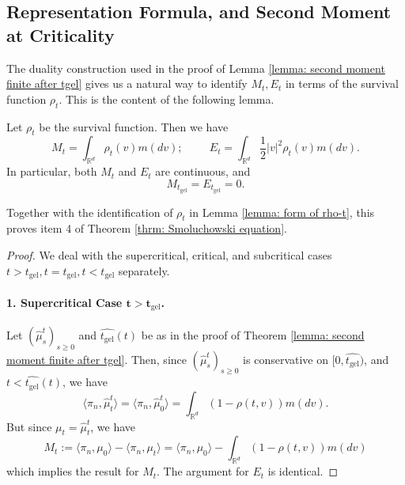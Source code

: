 \subsection{Representation Formula, and Second Moment at Criticality} 

The duality construction used in the proof of Lemma \ref{lemma: second moment finite after tgel} gives us a natural way to identify $M_t, E_t$ in terms of the survival function $\rho_t$. This is the content of the following lemma. \begin{lemma}\label{lemma: representation of M, E} Let $\rho_t$ be the survival function. Then we have \begin{equation}\label{eq: formula for M, E}
    M_t = \int_{\mathbb{R}^d} \rho_t(v)m(dv); \hspace{1cm} E_t=\int_{\mathbb{R}^d} \frac{1}{2}|v|^2\rho_t(v)m(dv).
\end{equation} In particular, both $M_t$ and $E_t$ are continuous, and \begin{equation}
    M_{t_\mathrm{gel}}=E_{t_\mathrm{gel}}=0.
\end{equation} \end{lemma} Together with the identification of $\rho_t$ in Lemma \ref{lemma: form of rho-t}, this proves item 4 of Theorem \ref{thrm: Smoluchowski equation}. \begin{proof} We deal with the supercritical, critical, and subcritical cases $t>t_\mathrm{gel}, t=t_\mathrm{gel}, t<t_\mathrm{gel}$ separately. 
\paragraph{1. Supercritical Case $\mathbf{t>t_\mathrm{gel}}$.}  Let $(\widehat{\mu}^t_s)_{s\geq 0}$ and $\widehat{t_\mathrm{gel}}(t)$ be as in the proof of Theorem \ref{lemma: second moment finite after tgel}. Then, since $(\widehat{\mu}^t_s)_{s\geq 0}$ is conservative on $[0, \widehat{t_\mathrm{gel}})$, and $t<\widehat{t_\mathrm{gel}}(t)$, we have \begin{equation}
    \langle \pi_n, \widehat{\mu}^t_t\rangle =\langle \pi_n, \widehat{\mu}^t_0\rangle = \int_{\mathbb{R}^d} (1-\rho(t,v))m(dv).
\end{equation} But since $\mu_t=\widehat{\mu}^t_t$, we have \begin{equation}
    M_t:=\langle \pi_n, \mu_0\rangle -\langle \pi_n, \mu_t\rangle =\langle \pi_n, \mu_0\rangle - \int_{\mathbb{R}^d} (1-\rho(t,v))m(dv)
\end{equation} which implies the result for $M_t$. The argument for $E_t$ is identical. 

\end{proof}
